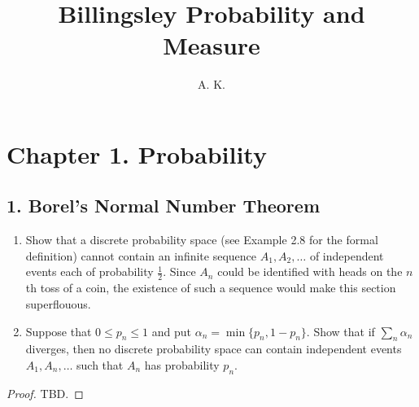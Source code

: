 \documentclass[11pt]{article}
\newenvironment{exercise}[2][Exercise]{\begin{trivlist}
\item[\hskip \labelsep {\bfseries #1}\hskip \labelsep {\bfseries #2.}]}{\end{trivlist}}
\begin{document}
\title{Billingsley Probability and Measure}%
\author{A. K.} %

\maketitle

\section*{Chapter 1. Probability}
\subsection*{1. Borel's Normal Number Theorem}
\begin{exercise}{1.1}
    \begin{enumerate}
        \item Show that a discrete probability space (see Example 2.8 for the formal definition) cannot contain an infinite sequence $A_1, A_2, \ldots$ of independent events each of probability $\frac{1}{2}$. Since $A_n$ could be identified with heads on the $n$th toss of a coin, the existence of such a sequence would make this section superflouous.
        \item Suppose that $0 \leq p_n \leq 1$ and put $\alpha_n = \min \{ p_n, 1 - p_n \}$. Show that if $\sum_n \alpha_n$ diverges, then no discrete probability space can contain independent events $A_1, A_n, \ldots$ such that $A_n$ has probability $p_n$.
    \end{enumerate}
\end{exercise}
\begin{proof}
    TBD.
\end{proof}
\end{document}

